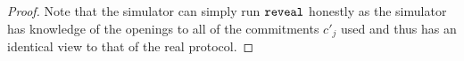 \begin{lemma}
	\begin{proof}
		Note that the simulator can simply run $\texttt{reveal}$ honestly as the simulator has knowledge of the openings to all of the commitments $c'_j$ used
		and thus has an identical view to that of the real protocol.
	\end{proof}
	
\end{lemma}





